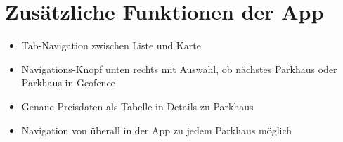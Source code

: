 \chapter{Zusätzliche Funktionen der App}
\label{chap:6}

\begin{itemize}
	\item Tab-Navigation zwischen Liste und Karte
	\item Navigations-Knopf unten rechts mit Auswahl, ob nächstes Parkhaus oder Parkhaus in Geofence
	\item Genaue Preisdaten als Tabelle in Details zu Parkhaus
	\item Navigation von überall in der App zu jedem Parkhaus möglich
\end{itemize}